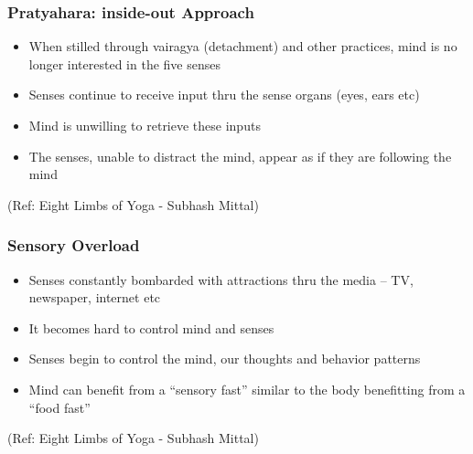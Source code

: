 \begin{frame}[fragile]\frametitle{Pratyahara: inside-out Approach}


	\begin{itemize}
	\item When stilled through vairagya (detachment) 
and other practices, mind is no longer 
interested in the five senses
	\item  Senses continue to receive input thru the 
sense organs (eyes, ears etc)
	\item Mind is unwilling to retrieve these inputs
	\item  The senses, unable to distract the mind, 
appear as if they are following the mind
	\end{itemize}

\tiny{(Ref: Eight Limbs of Yoga - Subhash Mittal)}

\end{frame}


\begin{frame}[fragile]\frametitle{Sensory Overload}


	\begin{itemize}
	\item  Senses constantly bombarded with attractions 
thru the media – TV, newspaper, internet etc
	\item  It becomes hard to control mind and senses
	\item  Senses begin to control the mind, our 
thoughts and behavior patterns
	\item  Mind can benefit from a ``sensory fast'' similar 
to the body benefitting from a ``food fast''
	\end{itemize}

\tiny{(Ref: Eight Limbs of Yoga - Subhash Mittal)}

\end{frame}

